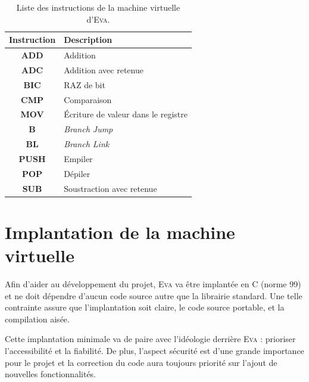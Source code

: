 \documentclass[11pt,twoside]{article}
\newcommand{\noun}[1]{\textsc{#1}}
\begin{document}
\begin{table}[tb]
  \begin{centering}
    \begin{tabular}{|c|l|}
      \hline
      \textbf{Instruction} & \textbf{Description}                \\
      \hline
      \hline
      \textbf{ADD}         & Addition                            \\
      \hline
      \textbf{ADC}         & Addition avec retenue               \\
      \hline
      \textbf{BIC}         & RAZ de bit                          \\
      \hline
      \textbf{CMP}         & Comparaison                         \\
      \hline
      \textbf{MOV}         & Écriture de valeur dans le registre \\
      \hline
      \textbf{B}           & \emph{Branch Jump}                  \\
      \hline
      \textbf{BL}          & \emph{Branch Link}                  \\
      \hline
      \textbf{PUSH}        & Empiler                             \\
      \hline
      \textbf{POP}         & Dépiler                             \\
      \hline
      \textbf{SUB}         & Soustraction avec retenue           \\
      \hline
    \end{tabular}
    \par\end{centering}
  \caption{Liste des instructions de la machine virtuelle d'\noun{Eva}.}
  \label{tab:instructions}
\end{table}


\section{Implantation de la machine virtuelle}

Afin d'aider au développement du projet, \noun{Eva} va être implantée
en C (norme 99) et ne doit dépendre d'aucun code source autre que
la librairie standard. Une telle contrainte assure que l'implantation
soit claire, le code source portable, et la compilation aisée.

Cette implantation minimale va de paire avec l'idéologie derrière
\noun{Eva} : prioriser l'accessibilité et la fiabilité. De plus, l'aspect
sécurité est d'une grande importance pour le projet et la correction
du code aura toujours priorité sur l'ajout de nouvelles fonctionnalités.
\end{document}
